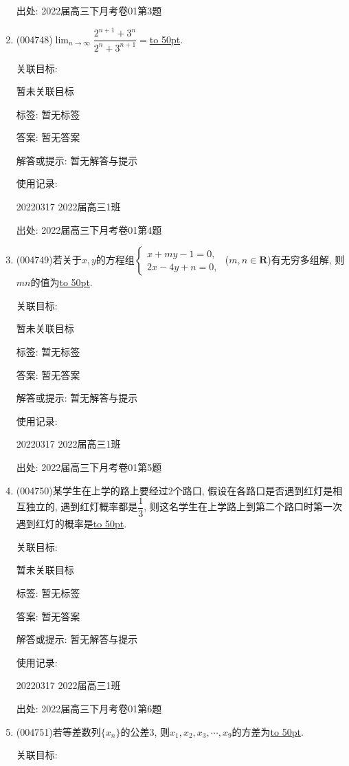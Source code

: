 \documentclass[10pt,a4paper]{article}
\newcommand{\blank}[1]{\underline{\hbox to #1pt{}}}
\begin{document}
\begin{enumerate}[1.]
出处: 2022届高三下月考卷01第3题
\item { (004748)}$\displaystyle\lim_{n\to \infty}\dfrac{2^{n+1}+3^n}{2^n+3^{n+1}}=$\blank{50}.


关联目标:

暂未关联目标



标签: 暂无标签

答案: 暂无答案

解答或提示: 暂无解答与提示

使用记录:

20220317	2022届高三1班	


出处: 2022届高三下月考卷01第4题
\item { (004749)}若关于$x,y$的方程组$\begin{cases}  x+my-1=0,  \\ 2x-4y+n=0,  \end{cases}$ ($m,n\in \mathbf{R}$)有无穷多组解, 则$mn$的值为\blank{50}.


关联目标:

暂未关联目标



标签: 暂无标签

答案: 暂无答案

解答或提示: 暂无解答与提示

使用记录:

20220317	2022届高三1班	


出处: 2022届高三下月考卷01第5题
\item { (004750)}某学生在上学的路上要经过$2$个路口, 假设在各路口是否遇到红灯是相互独立的, 遇到红灯概率都是$\dfrac 13$, 则这名学生在上学路上到第二个路口时第一次遇到红灯的概率是\blank{50}.


关联目标:

暂未关联目标



标签: 暂无标签

答案: 暂无答案

解答或提示: 暂无解答与提示

使用记录:

20220317	2022届高三1班	


出处: 2022届高三下月考卷01第6题
\item { (004751)}若等差数列$\{x_n\}$的公差$3$, 则$x_1,x_2,x_3,\cdots,x_9$的方差为\blank{50}.


关联目标:


\end{enumerate}
\end{document}
